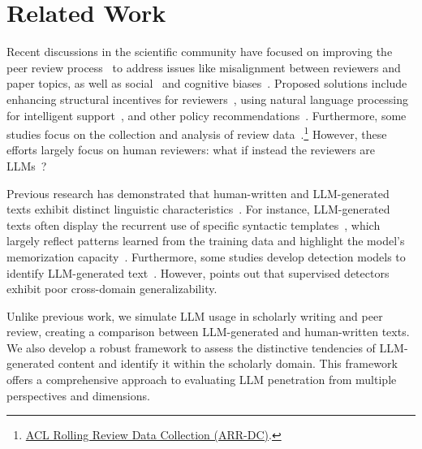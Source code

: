

\section{Related Work}




Recent discussions in the scientific community have focused on improving the peer review process~\cite{gurevych_et_al:DagRep.14.1.130, kuznetsov2024natural} to address issues like misalignment between reviewers and paper topics, as well as social~\cite{huber2022nobel, tomkins2017reviewer, manzoor2021uncovering} and cognitive biases~\cite{lee2015commensuration, stelmakh2021prior}. Proposed solutions include enhancing structural incentives for reviewers~\cite{rogers-augenstein-2020-improve}, using natural language processing for intelligent support~\cite{kuznetsov-etal-2022-revise, zyska-etal-2023-care, dycke-etal-2023-nlpeer, guo-etal-2023-automatic, kumar-etal-2023-reviewers}, and other policy recommendations~\cite{dycke-etal-2022-yes}. Furthermore, some studies focus on the collection and analysis of review data~\cite{kennard-etal-2022-disapere, staudinger-etal-2024-analysis, darcy-etal-2024-aries}.\footnote{\href{https://arr-data.aclweb.org/}{ACL Rolling Review Data Collection (ARR-DC)}.} 
However, these efforts largely focus on human reviewers: what if instead the reviewers are LLMs~\cite{weber2024other, gao2024reviewer2, hossain2025llmsmetareviewersassistantscase}?

Previous research has demonstrated that human-written and LLM-generated texts exhibit distinct linguistic characteristics~\cite{cheng2024beyond, song-etal-2025-assessing}.
For instance, LLM-generated texts often display the recurrent use of specific syntactic templates~\cite{shaib-etal-2024-detection}, which largely reflect patterns learned from the training data and highlight the model's memorization capacity~\cite{karamolegkou-etal-2023-copyright, zeng-etal-2024-exploring, zhu-etal-2024-beyond}.
Furthermore, some studies develop detection models to identify LLM-generated text~\cite{antoun-etal-2024-text, cheng2024beyond, xu-etal-2024-detecting, kumar-etal-2024-quis, abassy-etal-2024-llm}.
However, \citet{cheng2024beyond} points out that supervised detectors exhibit poor cross-domain generalizability.

Unlike previous work, we simulate LLM usage in scholarly writing and peer review, creating a comparison between LLM-generated and human-written texts.
We also develop a robust framework to assess the distinctive tendencies of LLM-generated content and identify it within the scholarly domain. This framework offers a comprehensive approach to evaluating LLM penetration from multiple perspectives and dimensions.

